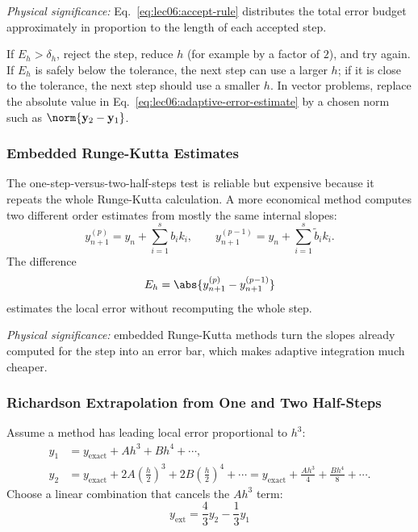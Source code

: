 \textit{Physical significance:} Eq.~\eqref{eq:lec06:accept-rule} distributes
the total error budget approximately in proportion to the length of each
accepted step.

If $E_h>\delta_h$, reject the step, reduce $h$ (for example by a factor of
$2$), and try again. If $E_h$ is safely below the tolerance, the next step
can use a larger $h$; if it is close to the tolerance, the next step should
use a smaller $h$. In vector problems, replace the absolute value in
Eq.~\eqref{eq:lec06:adaptive-error-estimate} by a chosen norm such as
$\norm{\mathbf{y}_2-\mathbf{y}_1}$.

\subsubsection{Embedded Runge-Kutta Estimates}
The one-step-versus-two-half-steps test is reliable but expensive because it
repeats the whole Runge-Kutta calculation. A more economical method computes
two different order estimates from mostly the same internal slopes:
\begin{equation}
    y_{n+1}^{(p)}
    =y_n+\sum_{i=1}^{s} b_i k_i,
    \qquad
    y_{n+1}^{(p-1)}
    =y_n+\sum_{i=1}^{s} \tilde b_i k_i.
    \label{eq:lec06:embedded-rk}
\end{equation}
The difference
\begin{equation}
    E_h=\abs{y_{n+1}^{(p)}-y_{n+1}^{(p-1)}}
    \label{eq:lec06:embedded-error}
\end{equation}
estimates the local error without recomputing the whole step.

\textit{Physical significance:} embedded Runge-Kutta methods turn the slopes
already computed for the step into an error bar, which makes adaptive
integration much cheaper.

\subsubsection{Richardson Extrapolation from One and Two Half-Steps}
Assume a method has leading local error proportional to $h^3$:
\begin{align}
    y_1 &= y_{\mathrm{exact}}+A h^3+B h^4+\cdots,
    \label{eq:lec06:richardson-one}\\
    y_2 &= y_{\mathrm{exact}}+2A\left(\frac{h}{2}\right)^3
          +2B\left(\frac{h}{2}\right)^4+\cdots
    =y_{\mathrm{exact}}+\frac{A h^3}{4}+\frac{B h^4}{8}+\cdots.
    \label{eq:lec06:richardson-two}
\end{align}
Choose a linear combination that cancels the $A h^3$ term:
\begin{equation}
    \boxed{
    y_{\mathrm{ext}}
    =\frac{4}{3}y_2-\frac{1}{3}y_1}
    \label{eq:lec06:richardson-result}
\end{equation}

